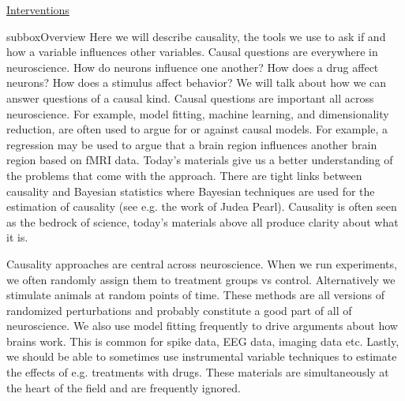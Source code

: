 \begin{textbox}{\href{https://compneuro.neuromatch.io/tutorials/W3D5_NetworkCausality/student/W3D5_Tutorial1.html}{Interventions }   }
\begin{subbox}{subbox}{Overview}
\scriptsize
Here we will describe causality, the tools we use to ask if and how a variable influences other variables. Causal questions are everywhere in neuroscience. How do neurons influence one another? How does a drug affect neurons? How does a stimulus affect behavior? We will talk about how we can answer questions of a causal kind. 
Causal questions are important all across neuroscience. For example, model fitting, machine learning, and dimensionality reduction, are often used to argue for or against causal models. For example, a regression may be used to argue that a brain region influences another brain region based on fMRI data. Today’s materials give us a better understanding of the problems that come with the approach. There are tight links between causality and Bayesian statistics where Bayesian techniques are used for the estimation of causality (see e.g. the work of Judea Pearl). Causality is often seen as the bedrock of science, today’s materials above all produce clarity about what it is.

Causality approaches are central across neuroscience. When we run experiments, we often randomly assign them to treatment groups vs control. Alternatively we stimulate animals at random points of time. These methods are all versions of randomized perturbations  and probably constitute a good part of all of neuroscience. We also use model fitting  frequently to drive arguments about how brains work. This is common for spike data, EEG data, imaging data etc. Lastly, we should be able to sometimes use instrumental variable techniques to estimate the effects of e.g. treatments with drugs. These materials are simultaneously at the heart of the field and are frequently ignored.

\end{subbox}
\end{textbox}

